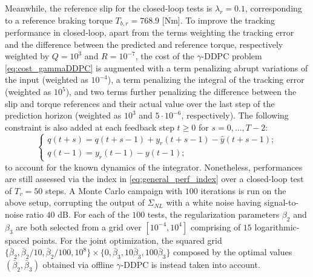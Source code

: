 \documentclass[letterpaper, 10 pt, conference]{ieeeconf}  %
\newcommand{\MFa}[1]{\textcolor{blue}{#1}}
\begin{document}
Meanwhile, the reference slip for the closed-loop tests is $\lambda_{r}=0.1$, corresponding to a reference braking torque $T_{b,r}=768.9$ [Nm]. To improve the tracking performance in closed-loop, apart from the terms weighting the tracking error and the difference between the predicted and reference torque, respectively weighted by $Q = 10^{3}$ and $R = 10^{-7}$, the cost of the $\gamma$-DDPC problem \eqref{eq:cost_gammaDDPC} is augmented with a term penalizing abrupt variations of the input (weighted as $10^{-4}$), a term penalizing the integral of the tracking error (weighted as $10^5$), and two terms further penalizing the difference between the slip and torque references and their actual value over the last step of the prediction horizon (weighted as $10^3$ and $5 \cdot 10^{-6}$, respectively). The following constraint is also added at each feedback step $t\geq 0$ for $s = 0,\ldots,T-2$:
\begin{equation}
	\begin{cases}
		q(t+s) = q(t+s-1) + y_r(t+s-1)-\hat{y} (t+s-1);\\
		q(t-1) = y_r(t-1)-y(t-1);
	\end{cases}
\end{equation}
to account for the known dynamics of the integrator. Nonetheless, performances are still assessed via the index in \eqref{eq:general_perf_index} over a closed-loop test of $T_{v}=50$ steps. %
A Monte Carlo campaign with $100$ iterations is run on the above setup, corrupting the %
output of $\Sigma_{NL}$ %
with a white noise having signal-to-noise ratio $40$ dB. For each of the $100$ tests, the regularization parameters $\beta_2$ and $\beta_3$ are both selected from a grid over $[10^{-4},10^4]$ comprising of $15$ logarithmic-spaced points. For the joint optimization, the squared grid $\{\bar{\beta}_2,\bar{\beta}_2/10,\bar{\beta}_2 /100, 10^8\} \times \{ 0,\bar{\beta}_3,10\bar{\beta}_3,100\bar{\beta}_3\}$ composed by the optimal values $(\bar{\beta}_2,\bar{\beta}_3)$ obtained via offline $\gamma$-DDPC is instead taken into account.
\end{document}
